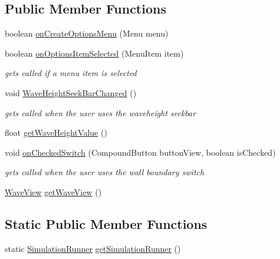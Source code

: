 \subsection*{Public Member Functions}
\begin{DoxyCompactItemize}
\item 
boolean \hyperlink{classwavesimulator_1_1MainActivity_aec42f57753b20a3200ff2d6faefbbfd6}{on\+Create\+Options\+Menu} (Menu menu)
\item 
boolean \hyperlink{classwavesimulator_1_1MainActivity_ac1e77788cf8d6eee4b48ccfec120b414}{on\+Options\+Item\+Selected} (Menu\+Item item)
\begin{DoxyCompactList}\small\item\em gets called if a menu item is selected \end{DoxyCompactList}\item 
void \hyperlink{classwavesimulator_1_1MainActivity_ad4717a53e98a2eeb4be677b754169d6d}{Wave\+Height\+Seek\+Bar\+Changed} ()
\begin{DoxyCompactList}\small\item\em gets called when the user uses the waveheight seekbar \end{DoxyCompactList}\item 
float \hyperlink{classwavesimulator_1_1MainActivity_a7b2a54961e6db516c70463c0a5a12e21}{get\+Wave\+Height\+Value} ()
\item 
void \hyperlink{classwavesimulator_1_1MainActivity_aa4b02a928bcf917374e14fa2950f3659}{on\+Checked\+Switch} (Compound\+Button button\+View, boolean is\+Checked)
\begin{DoxyCompactList}\small\item\em gets called when the user uses the wall boundary switch \end{DoxyCompactList}\item 
\hyperlink{classwavesimulator_1_1WaveView}{Wave\+View} \hyperlink{classwavesimulator_1_1MainActivity_a6f24f2ef94993440a4e7c7df229a0e97}{get\+Wave\+View} ()
\end{DoxyCompactItemize}
\subsection*{Static Public Member Functions}
\begin{DoxyCompactItemize}
\item 
static \hyperlink{classSolver_1_1SimulationRunner}{Simulation\+Runner} \hyperlink{classwavesimulator_1_1MainActivity_a79c45b397d8e357efbf26d07822b93dc}{get\+Simulation\+Runner} ()
\end{DoxyCompactItemize}
